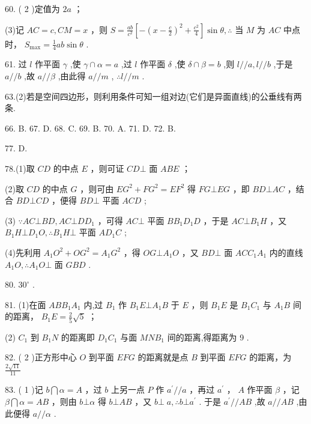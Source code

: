 \documentclass[10pt]{article}
\begin{document}
60. ( 2 )定值为 \({2a}\) ；

(3)记 \({AC} = c,{CM} = x\) ，则 \(S = \frac{ab}{{c}^{2}}\left\lbrack  {-{\left( x - \frac{c}{2}\right) }^{2} + \frac{{c}^{2}}{4}}\right\rbrack  \sin \theta ,\therefore\) 当 \(M\) 为 \({AC}\) 中点时， \({S}_{\max } = \frac{1}{4}{ab}\sin \theta\) .

61. 过 \(l\) 作平面 \(\gamma\) ,使 \(\gamma  \cap  \alpha  = a\) ,过 \(l\) 作平面 \(\delta\) ,使 \(\delta  \cap  \beta  = b\) ,则 \(l//a,l//b\) ,于是 \(a//b\) ,故 \(a//\beta\) ,由此得 \(a//m\) , \(\therefore l//m\) .

63.(2)若是空间四边形，则利用条件可知一组对边(它们是异面直线)的公垂线有两条.

66. B. 67. D. 68. C. 69. B. 70. A. 71. D. 72. B.

77. D.

78.(1)取 \({CD}\) 的中点 \(E\) ，则可证 \({CD}\bot\) 面 \({ABE}\) ；

(2)取 \({CD}\) 的中点 \(G\) ，则可由 \(E{G}^{2} + F{G}^{2} = E{F}^{2}\) 得 \({FG} \bot  {EG}\) ，即 \({BD} \bot  {AC}\) ，结合 \({BD} \bot  {CD}\) ，便得 \({BD} \bot\) 平面 \({ACD}\) ;

(3) \(\because {AC} \bot  {BD},{AC} \bot  {D{D}_{1}}\) ，可得 \({AC} \bot\) 平面 \(B{B}_{1}{D}_{1}D\) ，于是 \({AC} \bot  {B}_{1}H\) ，又 \({B}_{1}H \bot  {D}_{1}O,\therefore {B}_{1}H \bot\) 平面 \(A{D}_{1}C\) ;

(4)先利用 \({A}_{1}{O}^{2} + O{G}^{2} = {A}_{1}{G}^{2}\) ，得 \({OG}\bot {A}_{1}O\) ，又 \({BD}\bot\) 面 \({AC}{C}_{1}{A}_{1}\) 内的直线 \({A}_{1}O,\therefore {A}_{1}O\bot\) 面 \({GBD}\) .

80. \({30}^{ \circ  }\) .

81. (1)在面 \({AB}{B}_{1}{A}_{1}\) 内,过 \({B}_{1}\) 作 \({B}_{1}E \bot  {A}_{1}B\) 于 \(E\) ，则 \({B}_{1}E\) 是 \({B}_{1}{C}_{1}\) 与 \({A}_{1}B\) 间的距离， \({B}_{1}E = \frac{2}{5}\sqrt{5}\) ；

(2) \({C}_{1}\) 到 \({B}_{1}N\) 的距离即 \({D}_{1}{C}_{1}\) 与面 \({MN}{B}_{1}\) 间的距离,得距离为 9 .

82. ( 2 )正方形中心 \(O\) 到平面 \({EFG}\) 的距离就是点 \(B\) 到平面 \({EFG}\) 的距离，为 \(\frac{2\sqrt{11}}{11}\)

83. ( 1 )记 \(b\bigcap \alpha  = A\) ，过 \(b\) 上另一点 \(P\) 作 \({a}^{\prime }//a\) ，再过 \({a}^{\prime }\) ， \(A\) 作平面 \(\beta\) ，记 \(\beta \bigcap \alpha  = {AB}\) ，则由 \(b\bot \alpha\) 得 \(b\bot {AB}\) ，又 \(b\bot \; a,\therefore b \bot  {a}^{\prime }\) . 于是 \({a}^{\prime }//{AB}\) ,故 \(a//{AB}\) ,由此便得 \(a//\alpha\) .
\end{document}
